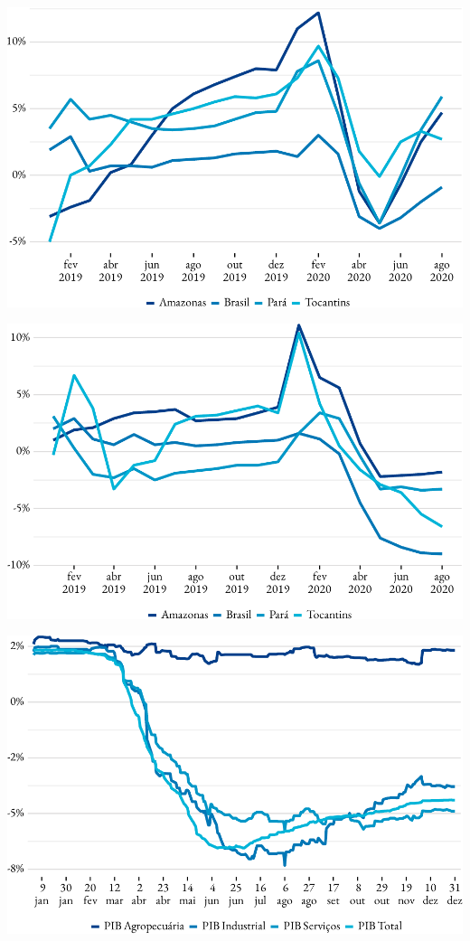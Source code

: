 \includegraphics{fig/pmc_ibge-1.pdf}

\includegraphics{fig/pms_ibge-1.pdf}

\includegraphics{fig/pib_expec-1.pdf}
